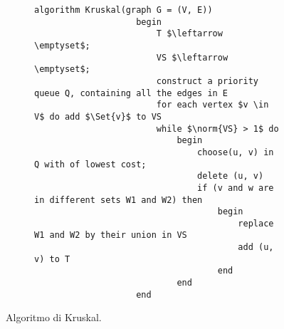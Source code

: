 \documentclass{subfiles}
\begin{document}
\begin{figure}[!h]
    \centering
    \begin{subfigure}[b]{0.85\textwidth}
        \begin{lstlisting}[language = algol]
                algorithm Kruskal(graph G = (V, E))
                    begin
                        T $\leftarrow \emptyset$;
                        VS $\leftarrow \emptyset$;
                        construct a priority queue Q, containing all the edges in E
                        for each vertex $v \in V$ do add $\Set{v}$ to VS
                        while $\norm{VS} > 1$ do
                            begin
                                choose(u, v) in Q with of lowest cost;
                                delete (u, v)
                                if (v and w are in different sets W1 and W2) then
                                    begin
                                        replace W1 and W2 by their union in VS
                                        add (u, v) to T
                                    end
                            end
                    end
            \end{lstlisting}
    \end{subfigure}
    \caption{Algoritmo di Kruskal.}
    \label{Fig:6.1}
\end{figure}
\end{document}
